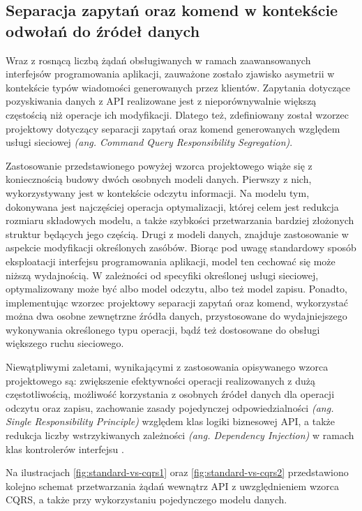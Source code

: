 \subsection*{Separacja zapytań oraz komend w kontekście odwołań do źródeł danych}
Wraz z rosnącą liczbą żądań obsługiwanych w ramach zaawansowanych interfejsów programowania aplikacji, zauważone zostało zjawisko asymetrii w kontekście typów wiadomości generowanych przez klientów. Zapytania dotyczące pozyskiwania danych z API realizowane jest z nieporównywalnie większą częstością niż operacje ich modyfikacji. Dlatego też, zdefiniowany został wzorzec projektowy dotyczący separacji zapytań oraz komend generowanych względem usługi sieciowej \textit{(ang. Command Query Responsibility Segregation)}.

Zastosowanie przedstawionego powyżej wzorca projektowego wiąże się z koniecznością budowy dwóch osobnych modeli danych. Pierwszy z nich, wykorzystywany jest w kontekście odczytu informacji. Na modelu tym, dokonywana jest najczęściej operacja optymalizacji, której celem jest redukcja rozmiaru składowych modelu, a także szybkości przetwarzania bardziej złożonych struktur będących jego częścią. Drugi z modeli danych, znajduje zastosowanie w aspekcie modyfikacji określonych zasóbów. Biorąc pod uwagę standardowy sposób eksploatacji interfejsu programowania aplikacji, model ten cechować się może niższą wydajnością. W zależności od specyfiki określonej usługi sieciowej, optymalizowany może być albo model odczytu, albo też model zapisu. Ponadto, implementując wzorzec projektowy separacji zapytań oraz komend, wykorzystać można dwa osobne zewnętrzne źródła danych, przystosowane do wydajniejszego wykonywania określonego typu operacji, bądź też dostosowane do obsługi większego ruchu sieciowego.   

Niewątpliwymi zaletami, wynikającymi z zastosowania opisywanego wzorca projektowego są: zwiększenie efektywności operacji realizowanych z dużą częstotliwością, możliwość korzystania z osobnych źródeł danych dla operacji odczytu oraz zapisu, zachowanie zasady pojedynczej odpowiedzialności \textit{(ang. Single Responsibility Principle)} względem klas logiki biznesowej API, a także redukcja liczby wstrzykiwanych zależności \textit{(ang. Dependency Injection)} w ramach klas kontrolerów interfejsu \cite{cs7194}.

Na ilustracjach \ref{fig:standard-vs-cqrs1} oraz \ref{fig:standard-vs-cqrs2} przedstawiono kolejno schemat przetwarzania żądań wewnątrz API z uwzględnieniem wzorca CQRS, a także przy wykorzystaniu pojedynczego modelu danych.

